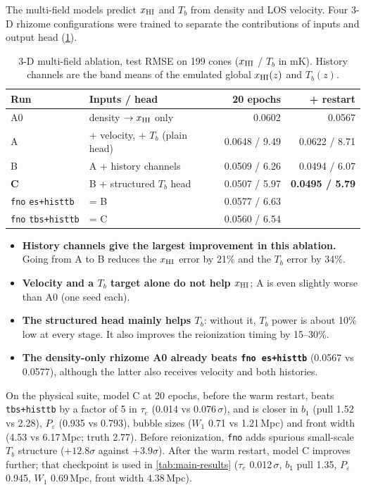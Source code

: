 The multi-field models predict $x_{\mathrm{HI}}$ and $T_b$ from density and LOS velocity. Four 3-D rhizome configurations were trained to separate the contributions of inputs and output head (\cref{tab:results-3d-mf}).

\begin{table}[!htbp]
  \centering
  \caption{3-D multi-field ablation, test RMSE on 199 cones ($x_{\mathrm{HI}}$ / $T_b$ in mK). History channels are the band means of the emulated global $x_{\mathrm{HI}}(z)$ and $T_b(z)$.}
  \label{tab:results-3d-mf}
  \footnotesize
  \setlength{\tabcolsep}{3pt}
  \begin{tabular}{@{}lp{2.6cm}rr@{}}
    \toprule
    Run & Inputs / head & 20 epochs & + restart \\
    \midrule
    A0 & density $\to x_{\mathrm{HI}}$ only & 0.0602 & 0.0567 \\
    A & + velocity, + $T_b$ (plain head) & 0.0648 / 9.49 & 0.0622 / 8.71 \\
    B & A + history channels & 0.0509 / 6.26 & 0.0494 / 6.07 \\
    \textbf{C} & B + structured $T_b$ head & 0.0507 / 5.97 & \textbf{0.0495 / 5.79} \\
    \midrule
    \texttt{fno} \texttt{es+histtb} & = B & 0.0577 / 6.63 & \\
    \texttt{fno} \texttt{tbs+histtb} & = C & 0.0560 / 6.54 & \\
    \bottomrule
  \end{tabular}
\end{table}

\begin{itemize}
  \item \textbf{History channels give the largest improvement in this ablation.} Going from A to B reduces the $x_{\mathrm{HI}}$ error by 21\% and the $T_b$ error by 34\%.
  \item \textbf{Velocity and a $T_b$ target alone do not help $x_{\mathrm{HI}}$}; A is even slightly worse than A0 (one seed each).
  \item \textbf{The structured head mainly helps $T_b$}: without it, $T_b$ power is about 10\% low at every stage. It also improves the reionization timing by 15--30\%.
  \item \textbf{The density-only rhizome A0 already beats \texttt{fno}~\texttt{es+histtb}} (0.0567 vs 0.0577), although the latter also receives velocity and both histories.
\end{itemize}
On the physical suite, model C at 20 epochs, before the warm restart, beats \texttt{tbs+histtb} by a factor of 5 in $\tau_e$ (0.014 vs 0.076\,$\sigma$), and is closer in $b_1$ (pull 1.52 vs 2.28), $P_\varepsilon$ (0.935 vs 0.793), bubble sizes ($W_1$ 0.71 vs 1.21\,Mpc) and front width (4.53 vs 6.17\,Mpc; truth 2.77). Before reionization, \texttt{fno} adds spurious small-scale $T_b$ structure ($+12.8\sigma$ against $+3.9\sigma$). After the warm restart, model C improves further; that checkpoint is used in \cref{tab:main-results} ($\tau_e$ 0.012\,$\sigma$, $b_1$ pull 1.35, $P_\varepsilon$ 0.945, $W_1$ 0.69\,Mpc, front width 4.38\,Mpc).

